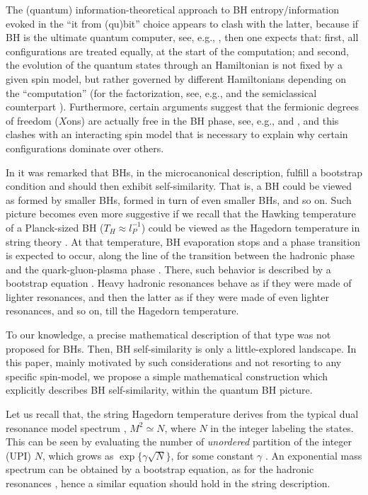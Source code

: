 \documentclass[aps,prd,showkeys,nofootinbib,superscriptaddress]{revtex4-2}
\begin{document}
The (quantum) information-theoretical approach to BH entropy/information evoked in the ``it from (qu)bit'' choice appears to clash with the latter, because if BH is the ultimate quantum computer, see, e.g., \cite{lloyd}, then one expects that: first, all configurations are treated equally, at the start of the computation; and second, the evolution of the quantum states through an Hamiltonian is not fixed by a given spin model, but rather governed by different Hamiltonians depending on the ``computation'' (for the factorization, see, e.g., \cite{Shor} and the semiclassical counterpart \cite{SemiShor}). Furthermore, certain arguments suggest that the fermionic degrees of freedom ($X$ons) are actually free in the BH phase, see, e.g., \cite{aischol} and \cite{aismal}, and this clashes with an interacting spin model that is necessary to explain why certain configurations dominate over others.

In \cite{Harms:1992nb,Harms:1992jt,Huang:2000kga} it was remarked that BHs, in the microcanonical description, fulfill a bootstrap condition \cite{hagedorn1,frautschi,nahm,hagedorn3} and should then exhibit self-similarity. That is, a BH could be viewed as formed by smaller BHs, formed in turn of even smaller BHs, and so on. Such picture becomes even more suggestive if we recall that the Hawking temperature \cite{haw1} of a Planck-sized BH ($T_H \approx l^{-1}_P$) could be viewed as the Hagedorn temperature in string theory \cite{veneziano1,susskind1,susskindBOOK}. At that temperature, BH evaporation stops and a phase transition is expected to occur, along the line of the transition between the hadronic phase and the quark-gluon-plasma phase \cite{Cabibbo:1975ig}. There, such behavior is described by a bootstrap equation \cite{hagedorn1,frautschi,nahm,hagedorn3}. Heavy hadronic resonances behave as if they were made of lighter resonances, and then the latter as if they were made of even lighter resonances, and so on, till the Hagedorn temperature.

To our knowledge, a precise mathematical description of that type was not proposed for BHs. Then, BH self-similarity is only a little-explored landscape. In this paper, mainly motivated by such considerations and not resorting to any specific spin-model, we propose a simple mathematical construction which explicitly describes BH self-similarity, within the quantum BH picture.


Let us recall that, the string Hagedorn temperature derives from the typical dual resonance model spectrum \cite{veneziano1}, $M^2 \simeq N$, where $N$ in the integer labeling the states. This can be seen by evaluating the number of \textit{unordered} partition of the integer (UPI) $N$, which grows as $\exp\{\gamma \sqrt{N}\}$, for some constant $\gamma$ \cite{barton}. An exponential mass spectrum can be obtained by a bootstrap equation, as for the hadronic resonances \cite{hagedorn1}, hence a similar equation should hold in the string description.
\end{document}
